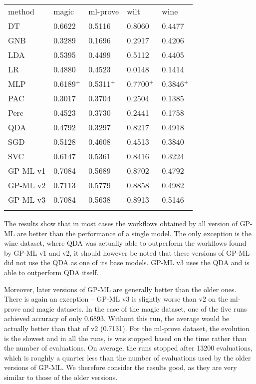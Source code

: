 \documentclass{ws-ijait}
\begin{document}
\begin{table}[ht]
{\begin{tabular}{lllll}
\toprule
method 						& magic 	& ml-prove 	& wilt 		& wine      \\
\colrule
DT 							& 0.6622 	& 0.5116 	& 0.8060 	& 0.4477    \\
GNB 						& 0.3289	& 0.1696 	& 0.2917 	& 0.4206    \\
LDA 						& 0.5395 	& 0.4499 	& 0.5112 	& 0.4405    \\
LR 							& 0.4880 	& 0.4523 	& 0.0148 	& 0.1414    \\
MLP 						& 0.6189$^+$& 0.5311$^+$& 0.7700$^+$& 0.3846$^+$\\
PAC 						& 0.3017 	& 0.3704 	& 0.2504 	& 0.1385    \\
Perc 						& 0.4523 	& 0.3730 	& 0.2441 	& 0.1758    \\
QDA 						& 0.4792    & 0.3297 	& 0.8217 	& 0.4918    \\
SGD 						& 0.5128 	& 0.4608 	& 0.4513 	& 0.3840    \\
SVC 						& 0.6147	& 0.5361 	& 0.8416 	& 0.3224    \\
\colrule
GP-ML v1\cite{SSCI2015} 	& 0.7084 	& 0.5689 	& 0.8702 	& 0.4792    \\
GP-ML v2\cite{7814654} 		& 0.7113	& 0.5779	& 0.8858 	& 0.4982    \\
GP-ML v3					& 0.7084	& 0.5638	& 0.8913	& 0.5146    \\			
\botrule
\end{tabular}}
\end{table} 

The results show that in most cases the workflows obtained by all version of
GP-ML are better than the performance of a single model. The only exception is
the wine dataset, where QDA was actually able to outperform the workflows found
by GP-ML v1 and v2, it should however be noted that these versions of GP-ML did
not use the QDA as one of its base models. GP-ML v3 uses the QDA and is able to
outperform QDA itself.

Moreover, later versions of GP-ML are generally better than the older ones.
There is again an exception -- GP-ML v3 is slightly worse than v2 on the
ml-prove and magic datasets. In the case of the magic dataset, one of the five
runs achieved accuracy of only 0.6893. Without this run, the average would be
actually better than that of v2 (0.7131). For the ml-prove dataset, the
evolution is the slowest and in all the runs, is was stopped based on the time 
rather than the number of evaluations. On average, the runs stopped after 13200
evaluations, which is roughly a quarter less than the number of evaluations 
used by the older versions of GP-ML. We therefore consider the results good, as
they are very similar to those of the older versions.
\end{document}
